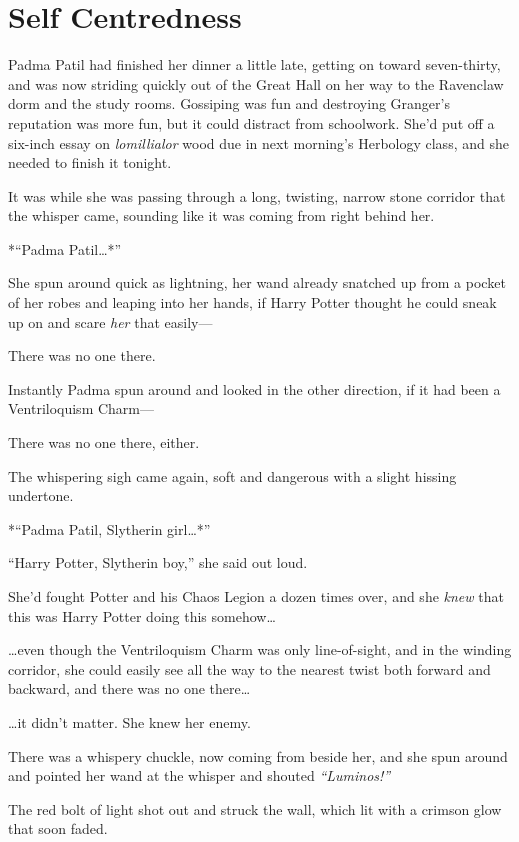 \chapter{Self Centredness}\label{self-centredness}

Padma Patil had finished her dinner a little late, getting on toward
seven-thirty, and was now striding quickly out of the Great Hall on her
way to the Ravenclaw dorm and the study rooms. Gossiping was fun and
destroying Granger's reputation was more fun, but it could distract from
schoolwork. She'd put off a six-inch essay on \emph{lomillialor} wood
due in next morning's Herbology class, and she needed to finish it
tonight.

It was while she was passing through a long, twisting, narrow stone
corridor that the whisper came, sounding like it was coming from right
behind her.

*``Padma Patil\ldots{}*''

She spun around quick as lightning, her wand already snatched up from a
pocket of her robes and leaping into her hands, if Harry Potter thought
he could sneak up on and scare \emph{her} that easily---

There was no one there.

Instantly Padma spun around and looked in the other direction, if it had
been a Ventriloquism Charm---

There was no one there, either.

The whispering sigh came again, soft and dangerous with a slight hissing
undertone.

*``Padma Patil, Slytherin girl\ldots{}*''

``Harry Potter, Slytherin boy,'' she said out loud.

She'd fought Potter and his Chaos Legion a dozen times over, and she
\emph{knew} that this was Harry Potter doing this somehow\ldots{}

\ldots{}even though the Ventriloquism Charm was only line-of-sight, and
in the winding corridor, she could easily see all the way to the nearest
twist both forward and backward, and there was no one there\ldots{}

\ldots{}it didn't matter. She knew her enemy.

There was a whispery chuckle, now coming from beside her, and she spun
around and pointed her wand at the whisper and shouted
\emph{``Luminos!''}

The red bolt of light shot out and struck the wall, which lit with a
crimson glow that soon faded.

